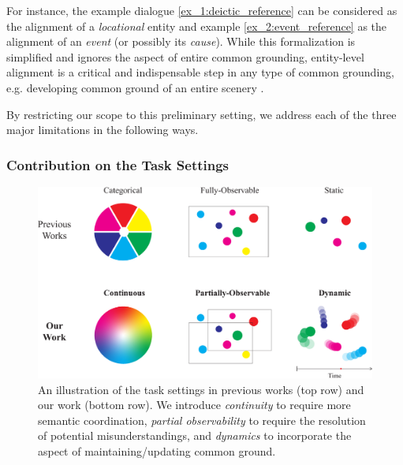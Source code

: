 For instance, the example dialogue \ref{ex_1:deictic_reference} can be considered as the alignment of a \textit{locational} entity and example \ref{ex_2:event_reference} as the alignment of an \textit{event} (or possibly its \textit{cause}). While this formalization is simplified and ignores the aspect of entire common grounding, entity-level alignment is a critical and indispensable step in any type of common grounding, e.g. developing common ground of an entire scenery \citep{das2017visual,haber-etal-2019-photobook,alamri2019audio}.

By restricting our scope to this preliminary setting, we address each of the three major limitations in the following ways.

\subsubsection{Contribution on the Task Settings}

\begin{figure}[t!]
\centering
\includegraphics[width=\textwidth]{task_design.pdf}
\caption{An illustration of the task settings in previous works (top row) and our work (bottom row). We introduce \textit{continuity} to require more semantic coordination, \textit{partial observability} to require the resolution of potential misunderstandings, and \textit{dynamics} to incorporate the aspect of maintaining/updating common ground.
}
\label{01_fig:task_design}
\end{figure}

